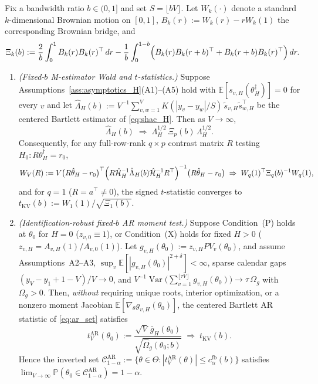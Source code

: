 \begin{proposition}
\label{prop:proof_fixed_b_ar}
Fix a bandwidth ratio $b \in (0, 1]$ and set $S = \lfloor b V \rfloor$. Let $W_k(\cdot)$ denote a standard $k$-dimensional Brownian motion on $[0,1]$, $B_k(r) := W_k(r) - r W_k(1)$ the corresponding Brownian bridge, and
\[
\Xi_k(b) := \frac{2}{b}\int_0^1 B_k(r) B_k(r)^\top\,dr - \frac{1}{b}\int_0^{1-b}\Bigl(B_k(r) B_k(r+b)^\top + B_k(r+b) B_k(r)^\top\Bigr)\,dr.
\]
\begin{enumerate}
  \item[\textbf{(i)}] \emph{(Fixed-$b$ M-estimator Wald and $t$-statistics.)} Suppose Assumptions~\ref{ass:asymptotics_H}(A1)--(A5) hold with $\mathbb{E}[s_{v,H}(\theta_H^\dagger)] = 0$ for every $v$ and let $\hat\Lambda_H(b) := V^{-1}\sum_{v,w=1}^V K(|y_v - y_w|/S)\,\tilde{s}_{v,H}\tilde{s}_{w,H}^\top$ be the centered Bartlett estimator of \eqref{eq:shac_H}. Then as $V \to \infty$,
  \[
  \hat\Lambda_H(b) \;\Rightarrow\; \Lambda_H^{1/2}\,\Xi_p(b)\,\Lambda_H^{1/2}.
  \]
  Consequently, for any full-row-rank $q \times p$ contrast matrix $R$ testing $H_0: R\theta_H^\dagger = r_0$,
  \[
  W_V(R) := V\bigl(R\hat\theta_H - r_0\bigr)^\top \Bigl(R\hat{\mathcal{H}}_H^{-1}\hat\Lambda_H(b)\hat{\mathcal{H}}_H^{-1} R^\top\Bigr)^{-1}\bigl(R\hat\theta_H - r_0\bigr)
  \;\Rightarrow\; W_q(1)^\top \Xi_q(b)^{-1} W_q(1),
  \]
  and for $q = 1$ ($R = a^\top \neq 0$), the signed $t$-statistic converges to $t_{\mathrm{KV}}(b) := W_1(1)/\sqrt{\Xi_1(b)}$.

  \item[\textbf{(ii)}] \emph{(Identification-robust fixed-$b$ AR moment test.)} Suppose Condition~(P) holds at $\theta_0$ for $H = 0$ ($z_{v,0} \equiv 1$), or Condition~(X) holds for fixed $H > 0$ ($z_{v,H} = A_{v,H}(1)/A_{v,0}(1)$). Let $g_{v,H}(\theta_0) := z_{v,H} PV_v(\theta_0)$, and assume Assumptions~A2--A3, $\sup_v \mathbb{E}[|g_{v,H}(\theta_0)|^{2+\delta}] < \infty$, sparse calendar gaps $(y_V - y_1 + 1 - V)/V \to 0$, and $V^{-1}\operatorname{Var}\!\bigl(\sum_{v=1}^{\lfloor \tau V \rfloor} g_{v,H}(\theta_0)\bigr) \to \tau\,\Omega_g$ with $\Omega_g > 0$. Then, \emph{without} requiring unique roots, interior optimization, or a nonzero moment Jacobian $\mathbb{E}[\nabla_\theta g_{v,H}(\theta_0)]$, the centered Bartlett AR statistic of \eqref{eq:ar_set} satisfies
  \[
  t_V^{\mathrm{AR}}(\theta_0) := \frac{\sqrt{V}\,\bar{g}_H(\theta_0)}{\sqrt{\hat\Omega_g(\theta_0; b)}} \;\Rightarrow\; t_{\mathrm{KV}}(b).
  \]
  Hence the inverted set $\mathcal{C}_{1-\alpha}^{\mathrm{AR}} := \{\theta \in \Theta : |t_V^{\mathrm{AR}}(\theta)| \le c_\alpha^{\mathrm{fb}}(b)\}$ satisfies $\lim_{V\to\infty}\mathbb{P}(\theta_0 \in \mathcal{C}_{1-\alpha}^{\mathrm{AR}}) = 1 - \alpha$.
\end{enumerate}
\end{proposition}

